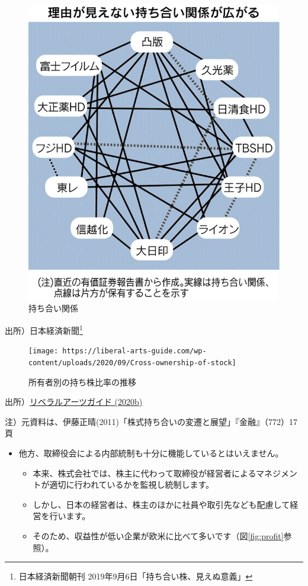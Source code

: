\documentclass[
]{book}
\begin{document}
\begin{figure}
\includegraphics[width=960px]{cross1} \caption{持ち合い関係}\label{fig:cross1}
\end{figure}

出所）日本経済新聞\footnote{日本経済新聞朝刊 2019年9月6日「持ち合い株、見えぬ意義」}

\begin{figure}
\texttt{[image: https://liberal-arts-guide.com/wp-content/uploads/2020/09/Cross-ownership-of-stock]} \caption{所有者別の持ち株比率の推移}\label{fig:cross2}
\end{figure}

出所）\href{https://liberal-arts-guide.com/cross-ownership-of-stock/}{リベラルアーツガイド (2020b)}

注）元資料は、伊藤正晴(2011)「株式持ち合いの変遷と展望」『金融』（772）17頁

\begin{itemize}
\item
  他方、取締役会による内部統制も十分に機能しているとはいえません。

  \begin{itemize}
  \item
    本来、株式会社では、株主に代わって取締役が経営者によるマネジメントが適切に行われているかを監視し統制します。
  \item
    しかし、日本の経営者は、株主のほかに社員や取引先なども配慮して経営を行います。
  \item
    そのため、収益性が低い企業が欧米に比べて多いです（図\ref{fig:profit}参照）。
  \end{itemize}
\end{itemize}
\end{document}
